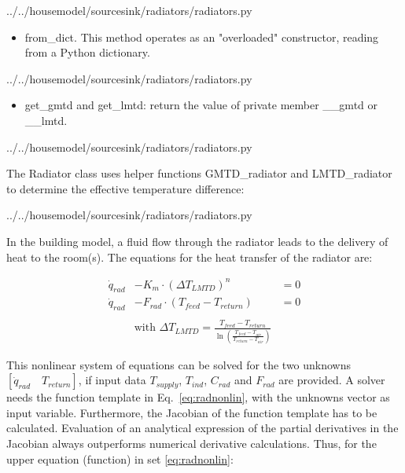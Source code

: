  
{../../housemodel/sourcesink/radiators/radiators.py}

\begin{itemize}
	\item \textsf{from\_dict}. This method operates as an "overloaded" constructor, reading from a Python \textsf{dictionary}.
\end{itemize}

 
{../../housemodel/sourcesink/radiators/radiators.py}

\begin{itemize}
	\item \textsf{get\_gmtd} and \textsf{get\_lmtd}: return the value of private member \_\_gmtd or \_\_lmtd.
\end{itemize}

 
{../../housemodel/sourcesink/radiators/radiators.py}

The Radiator class uses helper functions \textsf{GMTD\_radiator} and \textsf{LMTD\_radiator} to determine the effective temperature difference:

 
{../../housemodel/sourcesink/radiators/radiators.py}


In the building model, a fluid flow through the radiator leads to the delivery of heat to the room(s). The equations for the heat transfer of the radiator are: 

{\color{blue}
	\begin{equation}
		\label{eq:radnonlin}
		\begin{aligned}
			\dot{q}_{rad} &- K_m \cdot (\Delta T_{LMTD})^n &= 0 \\
			\dot{q}_{rad} &- F_{rad} \cdot (T_{feed} - T_{return}) &= 0 \\ \\
			&\text{with } \Delta T_{LMTD} = \frac{T_{feed} - T_{return}}{\ln\left(\frac{T_{feed} -T_{air}}{T_{return} - T_{air}}\right)}
		\end{aligned}
	\end{equation}
}

This nonlinear system of equations can be solved for the two unknowns $[\dot{q}_{rad} \quad T_{return}]$, if input data $T_{supply}$, $ T_{ind}$, $C_{rad}$ and $F_{rad}$ are provided. A solver needs the function template in Eq.~\ref{eq:radnonlin}, with the unknowns vector as input variable. Furthermore, the Jacobian of the function template has to be calculated. Evaluation of an analytical expression of the partial derivatives in the Jacobian always outperforms numerical derivative calculations. Thus, for the upper equation (function) in set \ref{eq:radnonlin}:

